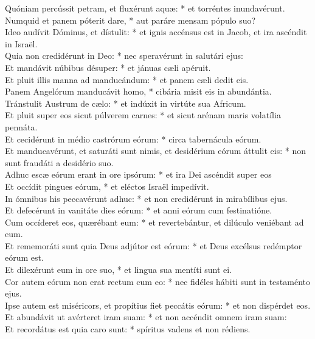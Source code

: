 {	Quóniam percússit petram, et fluxérunt aquæ: * et torréntes inundavérunt. \\
	Numquid et panem póterit dare, * aut paráre mensam pópulo suo? \\
	Ideo audívit Dóminus, et dístulit: * et ignis accénsus est in Jacob, et ira ascéndit in Israël. \\
	Quia non credidérunt in Deo: * nec speravérunt in salutári ejus: \\
	Et mandávit núbibus désuper: * et jánuas cæli apéruit. \\
	Et pluit illis manna ad manducándum: * et panem cæli dedit eis. \\
	Panem Angelórum manducávit homo, * cibária misit eis in abundántia. \\
	Tránstulit Austrum de cælo: * et indúxit in virtúte sua Africum. \\
	Et pluit super eos sicut púlverem carnes: * et sicut arénam maris volatília pennáta. \\
	Et cecidérunt in médio castrórum eórum: * circa tabernácula eórum. \\
	Et manducavérunt, et saturáti sunt nimis, et desidérium eórum áttulit eis: * non sunt fraudáti a desidério suo. \\
	Adhuc escæ eórum erant in ore ipsórum: * et ira Dei ascéndit super eos \\
	Et occídit pingues eórum, * et eléctos Israël impedívit. \\
	In ómnibus his peccavérunt adhuc: * et non credidérunt in mirabílibus ejus. \\
	Et defecérunt in vanitáte dies eórum: * et anni eórum cum festinatióne. \\
	Cum occíderet eos, quærébant eum: * et revertebántur, et dilúculo veniébant ad eum. \\
	Et rememoráti sunt quia Deus adjútor est eórum: * et Deus excélsus redémptor eórum est. \\
	Et dilexérunt eum in ore suo, * et lingua sua mentíti sunt ei. \\
	Cor autem eórum non erat rectum cum eo: * nec fidéles hábiti sunt in testaménto ejus. \\
	Ipse autem est miséricors, et propítius fiet peccátis eórum: * et non dispérdet eos. \\
	Et abundávit ut avérteret iram suam: * et non accéndit omnem iram suam: \\
	Et recordátus est quia caro sunt: * spíritus vadens et non rédiens. \\
}
